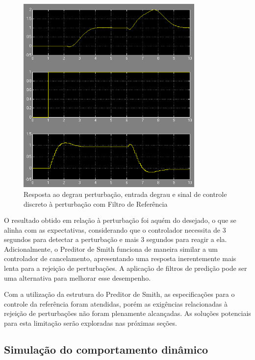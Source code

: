 \documentclass[a4paper,12pt]{article}
\begin{document}
   \begin{figure}[H]
  \centering
  \includegraphics[width=0.82\textwidth]{Imagens/q1p.png}
  \caption{Resposta ao degrau perturbação, entrada degrau e sinal de controle discreto à perturbação com Filtro de Referência}
  \end{figure}

O resultado obtido em relação à perturbação foi aquém do desejado, o que se alinha com as expectativas, considerando que o controlador necessita de 3 segundos para detectar a perturbação e mais 3 segundos para reagir a ela. Adicionalmente, o Preditor de Smith funciona de maneira similar a um controlador de cancelamento, apresentando uma resposta inerentemente mais lenta para a rejeição de perturbações. A aplicação de filtros de predição pode ser uma alternativa para melhorar esse desempenho.

Com a utilização da estrutura do Preditor de Smith, as especificações para o controle da referência foram atendidas, porém as exigências relacionadas à rejeição de perturbações não foram plenamente alcançadas. As soluções potenciais para esta limitação serão exploradas nas próximas seções.

\newpage


  



\subsection{Simulação do comportamento dinâmico}
\end{document}
